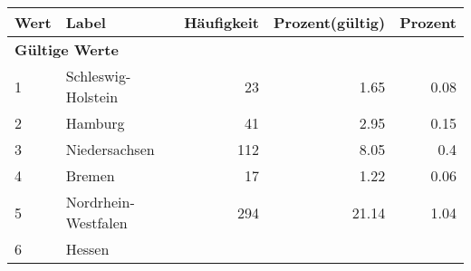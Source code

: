      \begin{longtable}{lXrrr}
     \toprule
     \textbf{Wert} & \textbf{Label} & \textbf{Häufigkeit} & \textbf{Prozent(gültig)} & \textbf{Prozent} \\
     \endhead
     \midrule
     \multicolumn{5}{l}{\textbf{Gültige Werte}}\\

     1 &
     \multicolumn{1}{X}{ Schleswig-Holstein   } &


       \num{23} &
       \num[round-mode=places,round-precision=2]{1.65} &
         \num[round-mode=places,round-precision=2]{0.08} \\

     2 &
     \multicolumn{1}{X}{ Hamburg   } &


       \num{41} &
       \num[round-mode=places,round-precision=2]{2.95} &
         \num[round-mode=places,round-precision=2]{0.15} \\

     3 &
     \multicolumn{1}{X}{ Niedersachsen   } &


       \num{112} &
       \num[round-mode=places,round-precision=2]{8.05} &
         \num[round-mode=places,round-precision=2]{0.4} \\

     4 &
     \multicolumn{1}{X}{ Bremen   } &


       \num{17} &
       \num[round-mode=places,round-precision=2]{1.22} &
         \num[round-mode=places,round-precision=2]{0.06} \\

     5 &
     \multicolumn{1}{X}{ Nordrhein-Westfalen   } &


       \num{294} &
       \num[round-mode=places,round-precision=2]{21.14} &
         \num[round-mode=places,round-precision=2]{1.04} \\

     6 &
     \multicolumn{1}{X}{ Hessen   } &



\end{longtable}
